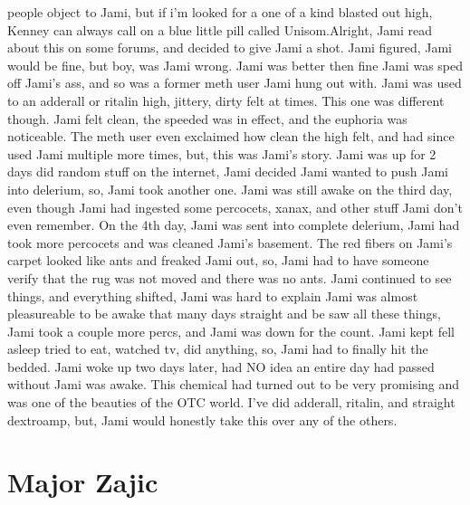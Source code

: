 \documentclass[12pt]{book}
\begin{document}
people object to Jami, but if i'm looked for a one of a kind blasted out high, Kenney can always call on a blue little pill called Unisom.Alright, Jami read about this on some forums, and decided to give Jami a shot. Jami figured, Jami would be fine, but boy, was Jami wrong. Jami was better then fine Jami was sped off Jami's ass, and so was a former meth user Jami hung out with. Jami was used to an adderall or ritalin high, jittery, dirty felt at times. This one was different though. Jami felt clean, the speeded was in effect, and the euphoria was noticeable. The meth user even exclaimed how clean the high felt, and had since used Jami multiple more times, but, this was Jami's story. Jami was up for 2 days did random stuff on the internet, Jami decided Jami wanted to push Jami into delerium, so, Jami took another one. Jami was still awake on the third day, even though Jami had ingested some percocets, xanax, and other stuff Jami don't even remember. On the 4th day, Jami was sent into complete delerium, Jami had took more percocets and was cleaned Jami's basement. The red fibers on Jami's carpet looked like ants and freaked Jami out, so, Jami had to have someone verify that the rug was not moved and there was no ants. Jami continued to see things, and everything shifted, Jami was hard to explain Jami was almost pleasureable to be awake that many days straight and be saw all these things, Jami took a couple more percs, and Jami was down for the count. Jami kept fell asleep tried to eat, watched tv, did anything, so, Jami had to finally hit the bedded. Jami woke up two days later, had NO idea an entire day had passed without Jami was awake. This chemical had turned out to be very promising and was one of the beauties of the OTC world. I've did adderall, ritalin, and straight dextroamp, but, Jami would honestly take this over any of the others.



\chapter{Major Zajic}
\end{document}
